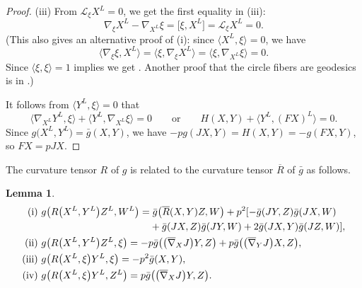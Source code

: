 \documentclass[10pt,a4paper]{amsart}
\numberwithin{equation}{section}
\newtheorem{Lemma}[Theorem]{Lemma}
\theoremstyle{definition}
\newcommand{\bn}{\nabla}
\newcommand{\bbn}{\overline{\nabla}}
\newcommand{\bxi}{\xi}
\newcommand{\br}{ R}
\newcommand{\brr}{\overline R}
\newcommand{\bgg}{\bar g}
\newcommand{\bg}{ g}
\newcommand{\xl}{X^L}
\newcommand{\yl}{Y^L}
\newcommand{\zl}{Z^L}
\begin{document}
\begin{proof}
(iii)
From $\mathcal{L}_{\xi} X^{L}=0$, we get the first equality in (iii):
\[\nabla_{\xi} X^{L} - \nabla_{X^{L}} \xi = \bigl[\xi, X^{L}\bigr] =
\mathcal{L}_{\xi} X^{L}=0.\]
(This also gives an alternative proof of (i): since $\bigl\langle \xl,\bxi\bigr\rangle = 0$, we have
\[\bigl\langle \bn_{\bxi}\bxi, \xl\bigr\rangle = \bigl\langle \bxi, \bn_{\bxi} \xl\bigr\rangle = \langle \bxi, \bn_{\xl} \bxi \rangle = 0.\]
Since $\langle\xi, \xi\rangle=1$ implies
 we get
\smash{$\bn_{\bxi}\bxi = 0$}. Another proof that the circle fibers are geodesics is in
\cite[Theorem 5.2.13]{Klingenberg}.)

It follows from $\bigl\langle Y^{L}, \xi\bigr\rangle=0$ that
\[
\bigl\langle\nabla_{X^{L}}Y^{L}, \xi\bigr\rangle + \bigl\langle Y^{L}, \nabla_{X^{L}}\xi\bigr\rangle = 0 \qquad \text{or}\qquad
H(X,Y) + \bigl\langle Y^{L}, (F X)^{L}\bigr\rangle=0.\]
Since $\bg\bigl(X^L, \yl\bigr) = \bgg(X,Y)$, we have
$-pg(JX,Y) = H(X,Y) = -g(FX, Y)$, so $FX = pJX$.
\end{proof}

The curvature tensor $\br$ of $\bg$ is related to the curvature tensor $\brr$ of $\bar g$ as follows.

\begin{Lemma} \label{lem1}
\begin{align*} {\rm (i)}\ & \bg\bigl(\br\bigl(X^L, Y^L\bigr)\zl,W^L\bigr) =
 \bgg\bigl( \brr(X,Y)Z,W\bigr) + p^2[-\bgg( JY,Z)\bgg( JX,W)\\
&\hphantom{ \bg\bigl(\br\bigl(X^L, Y^L\bigr)\zl,W^L\bigr) =}{}
+\bgg( JX,Z)\bgg( JY,W) +2\bgg( JX,Y)\bgg( JZ,W)],\\
{\rm (ii)}\ & \bg\bigl(\br\bigl(\xl, \yl\bigr)\zl, \bxi\bigr) = - p \bgg\bigl(\bigl(\bbn_{X} J\bigr) Y, Z\bigr)
+ p \bgg\bigl(\bigl(\bbn_{Y} J\bigr) X, Z\bigr),\\
{\rm (iii)}\ & \bg\bigl(\br\bigl(\xl,\bxi\bigr)\yl,\bxi\bigr) = -p^2\bgg(X,Y),\\
{\rm (iv)}\ & \bg\bigl(\br\bigl(\xl, \bxi\bigr)\yl, \zl\bigr) = p\bgg\bigl(\bigl(\bbn_XJ\bigr)Y,Z\bigr).
\end{align*}
\end{Lemma}
\end{document}
